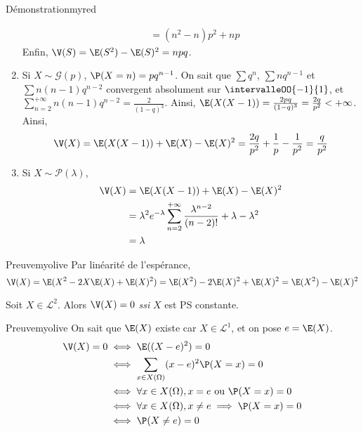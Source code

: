 \begin{demo}{Démonstration}{myred}
\begin{enumerate}
\begin{align*}
                &= (n^2 - n) p^2 + np
            \end{align*}
            Enfin, $\V(S) = \E(S^2) - \E(S)^2 = npq$.
            \item Si $X \sim \mathcal{G}(p)$, $\P(X = n) = pq^{n-1}$. On sait que $\sum q^n$, $\sum n q^{n-1}$ et $\sum n (n-1) q^{n-2}$ convergent absolument sur $\intervalleOO{-1}{1}$, et $\sum_{n=2}^{+\infty} n(n-1)q^{n-2} = \frac{2}{(1 - q)^3}$. Ainsi, $\E(X(X-1)) = \frac{2pq}{(1-q)^3} = \frac{2q}{p^2} < +\infty$. Ainsi, 
            \[ \V(X) = \E(X(X-1)) + \E(X) - \E(X)^2 = \frac{2q}{p^2} + \frac{1}{p} - \frac{1}{p^2} = \frac{q}{p^2} \] 
            \item Si $X \sim \mathcal{P}(\lambda)$, 
            \begin{align*}
                \V(X) 
                &= \E(X(X-1)) + \E(X) - \E(X)^2 \\
                &= \lambda^2 e^{-\lambda} \sum_{n=2}^{+\infty} \frac{\lambda^{n-2}}{(n-2)!} + \lambda - \lambda^2\\
                &= \lambda            
            \end{align*}
        \end{enumerate}
    \end{demo}

    \begin{demo}{Preuve}{myolive}
        Par linéarité de l’espérance,
        \[ \V(X) = \E(X^2 - 2 X \E(X) + \E(X)^2) = \E(X^2) - 2 \E(X)^2 + \E(X)^2 = \E(X^2) - \E(X)^2 \]
    \end{demo}

    \begin{prop}{}{}
        Soit $X \in \mathcal{L}^2$. Alors $\V(X) = 0$ \textit{ssi} $X$ est PS constante.
    \end{prop}

    \begin{demo}{Preuve}{myolive}
        On sait que $\E(X)$ existe car $X \in \mathcal{L}^1$, et on pose $e = \E(X)$. 
        \begin{align*}
            \V(X) = 0
            &\iff \E((X - e)^2) = 0 \\
            &\iff \sum_{x \in X(\Omega)} (x - e)^2 \P(X = x) = 0 \\
            &\iff \forall x \in X(\Omega), x = e \text{ ou } \P(X = x) = 0 \\
            &\iff \forall x \in X(\Omega), x \neq e \implies \P(X = x) = 0 \\
            &\iff \P(X \neq e) = 0
        \end{align*}
    \end{demo}

